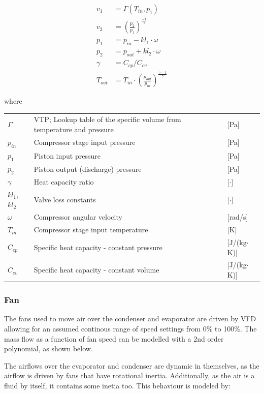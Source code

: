 \begin{align}
	v_1 &= \Gamma(T_{in},p_{1}) \\
	v_2 &= \left(\frac{p_2}{p_1}\right)^{\frac{-1}{\gamma}} \\
	p_1 &= p_{in} - kl_1 \cdot \omega \\
	p_2 &= p_{out} + kl_2 \cdot \omega \\
	\gamma &= C_{cp}/C_{cv} \\
	T_{out} &= T_{in}\cdot \left(\frac{p_{out}}{p_{in}}\right)^{\frac{\gamma-1}{\gamma}}
\end{align}

where

\begin{center}
	\begin{tabular}{l p{8cm} l}
		$\Gamma$				& VTP; Lookup table of the specific volume from temperature and pressure		& [\si{Pa}]\\
		$p_{in}$				& Compressor stage input pressure 			& [\si{Pa}]\\
		$p_1$					& Piston input pressure									& [\si{Pa}]\\
		$p_2$					& Piston output (discharge) pressure 		& [\si{Pa}]\\
		$\gamma$				& Heat capacity ratio 								& [$ \cdot $]\\
		$ kl_1$, $kl_2$			& Valve loss constants							& [$ \cdot $]\\
		$\omega$ 				& Compressor angular velocity 				& [\si{rad}/\si{s}]\\
		$T_{in}$ 				& Compressor stage input temperature 	& [\si{K}]\\
		$C_{cp}$ 				& Specific heat capacity - constant pressure 	& [\si{J}/(\si{kg}$ \cdot $\si{K})]\\
		$C_{cv} $ 				& Specific heat capacity - constant volume 	& [\si{J}/(\si{kg}$ \cdot $\si{K})]\\
	\end{tabular}
\end{center}


\subsubsection{Fan}
The fans used to move air over the condenser and evaporator are driven by VFD allowing for an assumed continous range of speed settings from 0\% to 100\%. The mass flow as a function of fan speed can be modelled with a 2nd order polynomial, as shown below.

The airflows over the evaporator and condenser are dynamic in themselves, as the airflow is driven by fans that have rotational inertia. Additionally, as the air is a fluid by itself, it contains some inetia too. This behaviour is modeled by:

